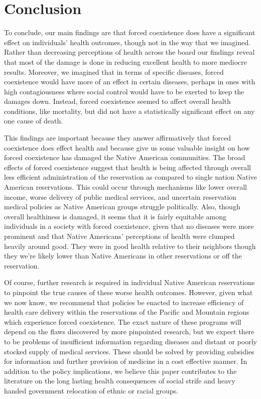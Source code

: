 \documentclass[12pt]{article}
\begin{document}
\section{Conclusion}
To conclude, our main findings are that forced coexistence does have a significant effect on individuals’ health outcomes, though not in the way that we imagined.  Rather than decreasing perceptions of health across the board our findings reveal that most of the damage is done in reducing excellent health to more mediocre results.  Moreover, we imagined that in terms of specific diseases, forced coexistence would have more of an effect in certain diseases, perhaps in ones with high contagiousness where social control would have to be exerted to keep the damages down.  Instead, forced coexistence seemed to affect overall health conditions, like mortality, but did not have a statistically significant effect on any one cause of death.

This findings are important because they answer affirmatively that forced coexistence does effect health and because give us some valuable insight on how forced coexistence has damaged the Native American communities. The broad effects of forced coexistence suggest that health is being affected through overall less efficient administration of the reservation as compared to single nation Native American reservations.  This could occur through mechanisms like lower overall income, worse delivery of public medical services, and uncertain reservation medical policies as Native American groups struggle politically. Also, though overall healthiness is damaged, it seems that it is fairly equitable among individuals in a society with forced coexistence, given that no diseases were more prominent and that Native Americans’ perceptions of health were clumped heavily around good.  They were in good health relative to their neighbors though they we’re likely lower than Native Americans in other reservations or off the reservation.  

Of course, further research is required in individual Native American reservations to pinpoint the true causes of these worse health outcomes.  However, given what we now know, we recommend that policies be enacted to increase efficiency of health care delivery within the reservations of the Pacific and Mountain regions which experience forced coexistence.  The exact nature of these programs will depend on the flaws discovered by more pinpointed research, but we expect there to be problems of insufficient information regarding diseases and distant or poorly stocked supply of medical services.  These should be solved by providing subsidies for information and further provision of medicine in a cost effective manner.  In addition to the policy implications, we believe this paper contributes to the literature on the long lasting health consequences of social strife and heavy handed government relocation of ethnic or racial groups.


\newpage


\end{document}
